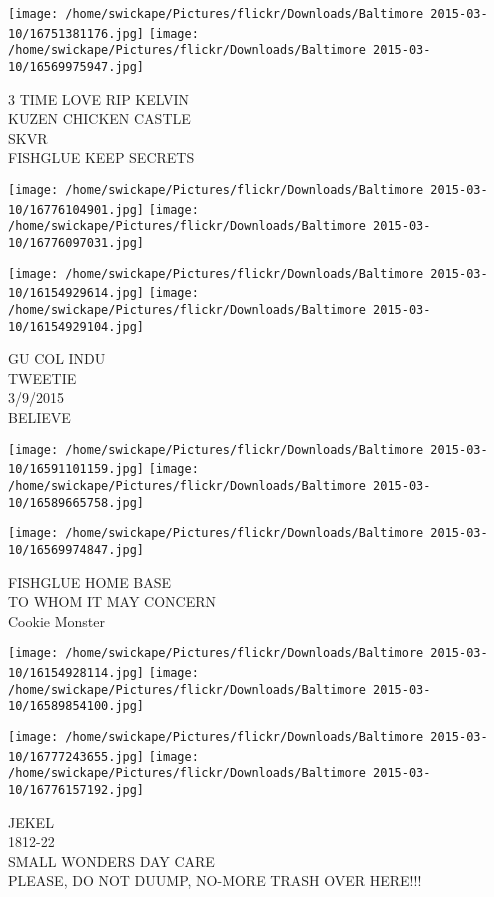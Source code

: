 \documentclass[10pt,letterpaper]{article}
\begin{document}
\texttt{[image: /home/swickape/Pictures/flickr/Downloads/Baltimore 2015-03-10/16751381176.jpg]}
\texttt{[image: /home/swickape/Pictures/flickr/Downloads/Baltimore 2015-03-10/16569975947.jpg]}

3 TIME LOVE RIP KELVIN\\
KUZEN CHICKEN CASTLE\\
SKVR\\
FISHGLUE KEEP SECRETS
\pagebreak

\texttt{[image: /home/swickape/Pictures/flickr/Downloads/Baltimore 2015-03-10/16776104901.jpg]}
\texttt{[image: /home/swickape/Pictures/flickr/Downloads/Baltimore 2015-03-10/16776097031.jpg]}

\texttt{[image: /home/swickape/Pictures/flickr/Downloads/Baltimore 2015-03-10/16154929614.jpg]}
\texttt{[image: /home/swickape/Pictures/flickr/Downloads/Baltimore 2015-03-10/16154929104.jpg]}

GU COL INDU\\
TWEETIE\\
3/9/2015\\
BELIEVE
\pagebreak

\texttt{[image: /home/swickape/Pictures/flickr/Downloads/Baltimore 2015-03-10/16591101159.jpg]}
\texttt{[image: /home/swickape/Pictures/flickr/Downloads/Baltimore 2015-03-10/16589665758.jpg]}

\vspace{0.25in}
\texttt{[image: /home/swickape/Pictures/flickr/Downloads/Baltimore 2015-03-10/16569974847.jpg]}

FISHGLUE HOME BASE\\
TO WHOM IT MAY CONCERN\\
Cookie Monster
\pagebreak

\texttt{[image: /home/swickape/Pictures/flickr/Downloads/Baltimore 2015-03-10/16154928114.jpg]}
\texttt{[image: /home/swickape/Pictures/flickr/Downloads/Baltimore 2015-03-10/16589854100.jpg]}

\texttt{[image: /home/swickape/Pictures/flickr/Downloads/Baltimore 2015-03-10/16777243655.jpg]}
\texttt{[image: /home/swickape/Pictures/flickr/Downloads/Baltimore 2015-03-10/16776157192.jpg]}

JEKEL\\
1812{-}22\\
SMALL WONDERS DAY CARE\\
PLEASE, DO NOT DUUMP, NO{-}MORE TRASH OVER HERE!!!
\pagebreak
\end{document}
